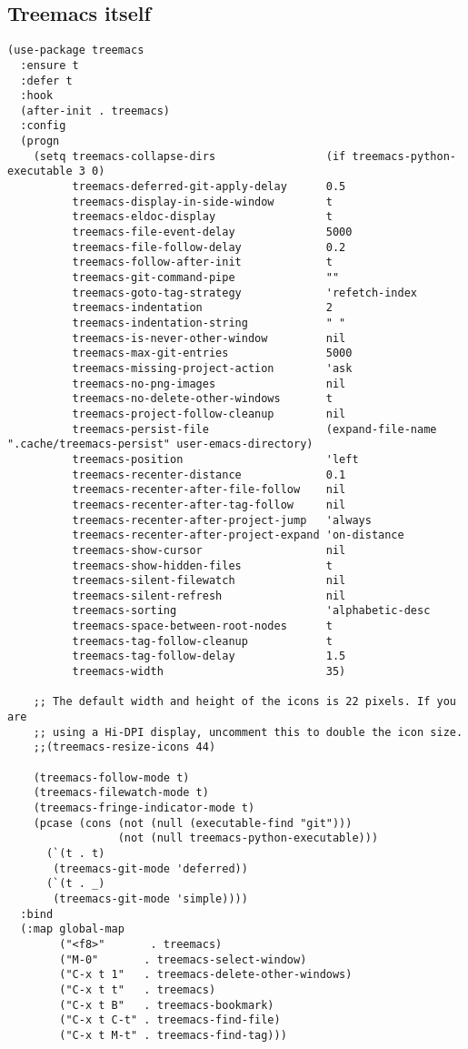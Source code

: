 \documentclass[11pt]{article}
\begin{document}
\subsection*{Treemacs itself}
\label{sec:orgac3e147}
\begin{verbatim}
(use-package treemacs
  :ensure t
  :defer t
  :hook
  (after-init . treemacs)
  :config
  (progn
    (setq treemacs-collapse-dirs                 (if treemacs-python-executable 3 0)
          treemacs-deferred-git-apply-delay      0.5
          treemacs-display-in-side-window        t
          treemacs-eldoc-display                 t
          treemacs-file-event-delay              5000
          treemacs-file-follow-delay             0.2
          treemacs-follow-after-init             t
          treemacs-git-command-pipe              ""
          treemacs-goto-tag-strategy             'refetch-index
          treemacs-indentation                   2
          treemacs-indentation-string            " "
          treemacs-is-never-other-window         nil
          treemacs-max-git-entries               5000
          treemacs-missing-project-action        'ask
          treemacs-no-png-images                 nil
          treemacs-no-delete-other-windows       t
          treemacs-project-follow-cleanup        nil
          treemacs-persist-file                  (expand-file-name ".cache/treemacs-persist" user-emacs-directory)
          treemacs-position                      'left
          treemacs-recenter-distance             0.1
          treemacs-recenter-after-file-follow    nil
          treemacs-recenter-after-tag-follow     nil
          treemacs-recenter-after-project-jump   'always
          treemacs-recenter-after-project-expand 'on-distance
          treemacs-show-cursor                   nil
          treemacs-show-hidden-files             t
          treemacs-silent-filewatch              nil
          treemacs-silent-refresh                nil
          treemacs-sorting                       'alphabetic-desc
          treemacs-space-between-root-nodes      t
          treemacs-tag-follow-cleanup            t
          treemacs-tag-follow-delay              1.5
          treemacs-width                         35)

    ;; The default width and height of the icons is 22 pixels. If you are
    ;; using a Hi-DPI display, uncomment this to double the icon size.
    ;;(treemacs-resize-icons 44)

    (treemacs-follow-mode t)
    (treemacs-filewatch-mode t)
    (treemacs-fringe-indicator-mode t)
    (pcase (cons (not (null (executable-find "git")))
                 (not (null treemacs-python-executable)))
      (`(t . t)
       (treemacs-git-mode 'deferred))
      (`(t . _)
       (treemacs-git-mode 'simple))))
  :bind
  (:map global-map
        ("<f8>"       . treemacs)
        ("M-0"       . treemacs-select-window)
        ("C-x t 1"   . treemacs-delete-other-windows)
        ("C-x t t"   . treemacs)
        ("C-x t B"   . treemacs-bookmark)
        ("C-x t C-t" . treemacs-find-file)
        ("C-x t M-t" . treemacs-find-tag)))
\end{verbatim}
\end{document}
